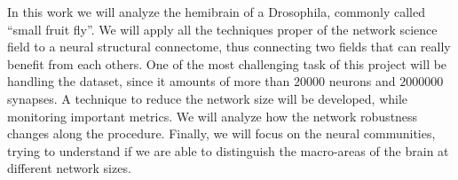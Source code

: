In this work we will analyze the hemibrain of a Drosophila, commonly called “small fruit fly”.
We will apply all the techniques proper of the network science field to a neural structural connectome,
thus connecting two fields that can really 
benefit from each others. One of the most challenging task of this project will be handling
the dataset, since it amounts of more than $20000$ neurons and $2000000$ synapses.
A technique to reduce the network size will be developed, while monitoring important metrics. 
We will analyze how the network robustness changes along the procedure.
Finally, we will focus on the neural communities, trying to understand 
if we are able to distinguish the macro-areas of the brain at different network sizes.
